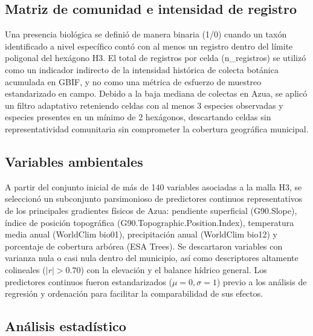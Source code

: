 \documentclass[
  12pt,
  man,
  floatsintext]{apa7}
\begin{document}
\subsection{Matriz de comunidad e intensidad de registro}\label{matriz-de-comunidad-e-intensidad-de-registro}

Una presencia biológica se definió de manera binaria (1/0) cuando un taxón identificado a nivel específico contó con al menos un registro dentro del límite poligonal del hexágono H3. El total de registros por celda (n\_registros) se utilizó como un indicador indirecto de la intensidad histórica de colecta botánica acumulada en GBIF, y no como una métrica de esfuerzo de muestreo estandarizado en campo. Debido a la baja mediana de colectas en Azua, se aplicó un filtro adaptativo reteniendo celdas con al menos 3 especies observadas y especies presentes en un mínimo de 2 hexágonos, descartando celdas sin representatividad comunitaria sin comprometer la cobertura geográfica municipal.

\subsection{Variables ambientales}\label{variables-ambientales}

A partir del conjunto inicial de más de 140 variables asociadas a la malla H3, se seleccionó un subconjunto parsimonioso de predictores continuos representativos de los principales gradientes físicos de Azua: pendiente superficial (G90.Slope), índice de posición topográfica (G90.Topographic.Position.Index), temperatura media anual (WorldClim bio01), precipitación anual (WorldClim bio12) y porcentaje de cobertura arbórea (ESA Trees). Se descartaron variables con varianza nula o casi nula dentro del municipio, así como descriptores altamente colineales (\(|r| > 0.70\)) con la elevación y el balance hídrico general. Los predictores continuos fueron estandarizados (\(\mu = 0, \sigma = 1\)) previo a los análisis de regresión y ordenación para facilitar la comparabilidad de sus efectos.

\subsection{Análisis estadístico}\label{anuxe1lisis-estaduxedstico}
\end{document}
